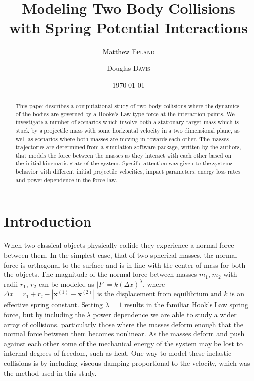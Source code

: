 \documentclass[aps,prl,floatfix,preprint,nofootinbib]{revtex4}
\begin{document}
\title{Modeling Two Body Collisions with Spring Potential Interactions}
\author{Matthew \textsc{Epland}}
\author{ Douglas \textsc{Davis}}
\date{\today}

\hypersetup{pdftitle=Modeling Two Body Collisions}

\begin{abstract}
  This paper describes a computational study of two body collisions where the dynamics of the bodies are governed by a Hooke's Law type force at the interaction points. We investigate a number of scenarios which involve both a stationary target mass which is stuck by a projectile mass with some horizontal velocity in a two dimensional plane, as well as scenarios where both masses are moving in towards each other. The masses trajectories are determined from a simulation software package, written by the authors, that models the force between the masses as they interact with each other based on the initial kinematic state of the system. Specific attention was given to the systems behavior with different initial projectile velocities, impact parameters, energy loss rates and power dependence in the force law.
\end{abstract}\maketitle
\section{Introduction}
When two classical objects physically collide they experience a normal force between them. In the simplest case, that of two spherical masses, the normal force is orthogonal to the surface and is in line with the center of mass for both the objects. The magnitude of the normal force between masses $m_{1}$, $m_{2}$ with radii $r_{1}$, $r_{2}$ can be modeled as $ \left| F \right| = k \left(\Delta x\right)^{\lambda}$, where $\Delta x = r_1 + r_2 - \left| \mathbf{x}^{(1)}-\mathbf{x}^{(2)} \right|$ is the displacement from equilibrium and $k$ is an effective spring constant. Setting $\lambda = 1$ results in the familiar Hook's Law spring force, but by including the $\lambda$ power dependence we are able to study a wider array of collisions, particularly those where the masses deform enough that the normal force between them becomes nonlinear. As the masses deform and push against each other some of the mechanical energy of the system may be lost to internal degrees of freedom, such as heat. One way to model these inelastic collisions is by including viscous damping proportional to the velocity, which was the method used in this study.
\end{document}
